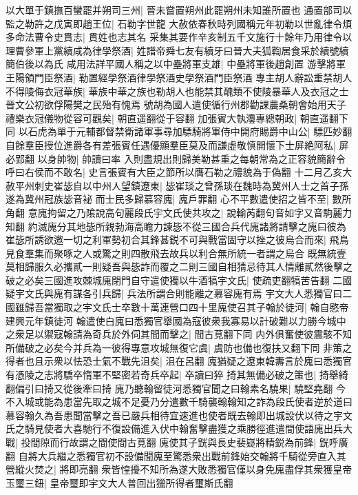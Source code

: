 以大單于鎮撫百蠻罷并朔司三州|{
	晉未嘗置朔州此罷朔州未知誰所置也}
通置部司以監之勒許之戊寅即趙王位|{
	石勒字世龍}
大赦依春秋時列國稱元年初勒以世亂律令煩多命法曹令史貫志|{
	貫姓也志其名}
采集其要作辛亥制五千文施行十餘年乃用律令以理曹參軍上黨續咸為律學祭酒|{
	姓譜帝舜七友有續牙曰晉大夫狐鞫居食采於續號續簡伯後以為氏}
咸用法詳平國人稱之以中壘將軍支雄|{
	中壘將軍後趙創置}
游擊將軍王陽領門臣祭酒|{
	勒置經學祭酒律學祭酒史學祭酒門臣祭酒}
專主胡人辭訟重禁胡人不得陵侮衣冠華族|{
	華族中華之族也勒胡人也能禁其醜類不使陵暴華人及衣冠之士晉文公初欲俘陽樊之民殆有愧焉}
號胡為國人遣使循行州郡勸課農桑朝會始用天子禮樂衣冠儀物從容可觀矣|{
	朝直遥翻從于容翻}
加張賓大執灋專總朝政|{
	朝直遥翻下同}
以石虎為單于元輔都督禁衛諸軍事尋加驃騎將軍侍中開府賜爵中山公|{
	驃匹妙翻}
自餘羣臣授位進爵各有差張賓任遇優顯羣臣莫及而謙虛敬慎開懷下士屏絶阿私|{
	屏必郢翻}
以身帥物|{
	帥讀曰率}
入則盡規出則歸美勒甚重之每朝常為之正容貌簡辭令呼曰右侯而不敢名|{
	史言張賓有大臣之節所以膺石勒之禮貌為于偽翻}
十二月乙亥大赦平州刺史崔毖自以中州人望鎮遼東|{
	毖崔琰之曾孫琰在魏時為冀州人士之首子孫遂為冀州冠族毖音袐}
而士民多歸慕容廆|{
	廆戶罪翻}
心不平數遣使招之皆不至|{
	數所角翻}
意廆拘留之乃隂說高句麗段氏宇文氏使共攻之|{
	說輸芮翻句音如字又音駒麗力知翻}
約滅廆分其地毖所親勃海高瞻力諫毖不從三國合兵代廆諸將請擊之廆曰彼為崔毖所誘欲邀一切之利軍勢初合其鋒甚鋭不可與戰當固守以挫之彼烏合而來|{
	飛鳥見食羣集而聚啄之人或驚之則四散飛去故兵以利合無所統一者謂之烏合}
既無統壹莫相歸服久必攜貳一則疑吾與毖詐而覆之二則三國自相猜忌待其人情離貳然後擊之破之必矣三國進攻棘城廆閉門自守遣使獨以牛酒犒宇文氏|{
	使疏吏翻犒苦告翻}
二國疑宇文氏與廆有謀各引兵歸|{
	兵法所謂合則能離之慕容廆有焉}
宇文大人悉獨官曰二國雖歸吾當獨取之宇文氏士卒數十萬連營口四十里廆使召其子翰於徒河|{
	翰自愍帝建興元年鎮徒河}
翰遣使白廆曰悉獨官舉國為寇彼衆我寡易以計破難以力勝今城中之衆足以禦寇翰請為奇兵於外伺其間而擊之|{
	間古莧翻下同}
内外俱奮使彼震駭不知所備破之必矣今并兵為一彼得專意攻城無復它虞|{
	虞防也備也復扶又翻下同}
非策之得者也且示衆以怯恐士氣不戰先沮矣|{
	沮在呂翻}
廆猶疑之遼東韓夀言於廆曰悉獨官有憑陵之志將驕卒惰軍不堅密若奇兵卒起|{
	卒讀曰猝}
掎其無備必破之策也|{
	掎舉綺翻偏引曰掎又從後牽曰掎}
廆乃聽翰留徒河悉獨官聞之曰翰素名驍果|{
	驍堅堯翻}
今不入城或能為患當先取之城不足憂乃分遣數千騎襲翰翰知之詐為段氏使者逆於道曰慕容翰久為吾患聞當擊之吾已嚴兵相待宜速進也使者既去翰即出城設伏以待之宇文氏之騎見使者大喜馳行不復設備進入伏中翰奮擊盡獲之乘勝徑進遣間使語廆出兵大戰|{
	投間隙而行故謂之間使間古莧翻}
廆使其子皝與長史裴嶷將精鋭為前鋒|{
	皝呼廣翻}
自將大兵繼之悉獨官初不設備聞廆至驚悉衆出戰前鋒始交翰將千騎從旁直入其營縱火焚之|{
	將即亮翻}
衆皆惶擾不知所為遂大敗悉獨官僅以身免廆盡俘其衆獲皇帝玉璽三鈕|{
	皇帝璽即宇文大人普回出獵所得者璽斯氏翻}
